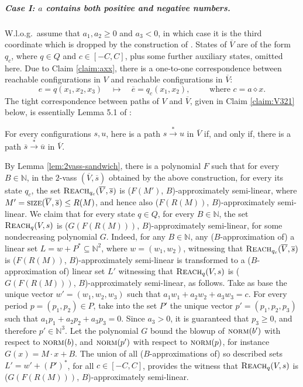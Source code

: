 \documentclass[a4paper, UKenglish, cleveref, autoref, thm-restate]{lipics-v2021}
\newcommand{\N}{\mathbb{N}}
\newcommand{\reach}{\textsc{Reach}}
\newcommand{\trans}[1]{\stackrel{#1}{\longrightarrow}}
\newcommand{\tran}{\trans{*}}
\newcommand{\norm}{\textsc{norm}}
\newcommand{\size}{\textsc{size}}
\newcommand{\kanapka}[2]{(#1, #2)-approximately semi-linear}
\newcommand{\vass}{{\sc vass}\xspace}
\newcommand{\dvass}{\parvass 2}
\newcommand{\parvass}[1]{{$#1$-\vass}\xspace}
\newcommand{\para}[1]{\vspace{-3mm}\subparagraph*{\bf #1.}}
\newcommand{\setfromto}[2]{[#1, #2]}
\newcommand{\Wlog}{W.l.o.g.~}
\newcommand{\essdvass}[1]{\overline{#1}}
\newcommand{\innprod}[2]{#1 \diamond #2} \newcommand{\pair}[2]{#1_{#2}}
\begin{document}
\begin{appendixproof}
\para{Case I: $a$ contains both positive and negative numbers}
\Wlog assume that $a_1, a_2 \geq 0$ and $a_3<0$,
in which case it is the third coordinate which is dropped 
by the construction of \cite[Lemma 5.1]{Zhang-geom}.
States of $\essdvass V$ are of the form $\pair q c$, where $q\in Q$ and $c\in\setfromto {-C} C$, 
plus some further auxiliary states, omitted here.
Due to Claim \ref{claim:axx},
there is a one-to-one correspondence between
reachable configurations in $V$ and reachable configurations in $\essdvass V$:
\[
e = q(x_1, x_2, x_3) \quad \longmapsto \quad
\essdvass e = \pair q c(x_1, x_2), 
\qquad
\text{ where } c = \innprod a x.
\]
The tight correspondence between paths of $V$ and $\essdvass V$,
 given in Claim \ref{claim:V321} below, is essentially 
Lemma 5.1 of \cite{Zhang-geom}:
\begin{claim} \label{claim:V321}
For every configurations $s,u$,
here is a path $s \tran u$ in $\essdvass V$
if, and only if,
there is a path $\essdvass s \tran \essdvass u$ in $\essdvass V$.
\end{claim}
By Lemma \ref{lem:2vass-sandwich}, there is a polynomial $F$ such that 
for every $B\in\N$,
in the \dvass
$(\essdvass V, \essdvass s)$ obtained by the above construction, 
for every its state $\pair q c$, the set 
$\reach_{\pair q c}(\essdvass V, \essdvass s)$ is \kanapka {$F(M')$} {$B$}, where
$M'=\size(\essdvass V, \essdvass s) \leq R(M)$, and hence also
\kanapka {$F(R(M))$} {$B$}.
We claim that for every state $q\in Q$, for every $B\in\N$, 
the set $\reach_q(V,s)$ is \kanapka {$G(F(R(M)))$} {$B$}, for some nondecreasing polynomial $G$.
Indeed, for any $B\in\N$, any ($B$-approximation of) a linear set 
$L = w + P^*\subseteq \N^2$, where $w=(w_1, w_2)$, witnessing that
$\reach_{\pair q c}(\essdvass V,\essdvass s)$  is \kanapka {$F(R(M))$} {$B$}
is transformed to a ($B$-approximation of) linear set $L'$ witnessing that
$\reach_{q}(V,s)$  is \kanapka {$G(F(R(M)))$} {$B$}, as follows.
Take as base the unique vector $w'=(w_1, w_2, w_3)$ such that $a_1 w_1 + a_2 w_2 + a_3 w_3 = c$.
For every period $p=(p_1, p_2) \in P$, take into the set $P'$  the unique vector
$p'=(p_1, p_2, p_3)$ such that $a_1 p_1 + a_2 p_2 + a_3 p_3 = 0$.
Since $a_3>0$, it is guaranteed that $p_3 \geq 0$, and therefore $p'\in\N^3$.
Let the polynomial $G$ bound the blowup of $\norm(b')$ with respect to $\norm(b)$, and 
$\norm(p')$ with respect to $\norm(p)$, for instance
$G(x) = M \cdot x + B$.
The union of all ($B$-approximations of) 
so described sets $L' = w' + (P')^*$, for all $c\in\setfromto {-C} C$, provides the witness that
$\reach_{q}(V,s)$ is \kanapka {$G(F(R(M)))$} {$B$}.


\end{appendixproof}
\end{document}
